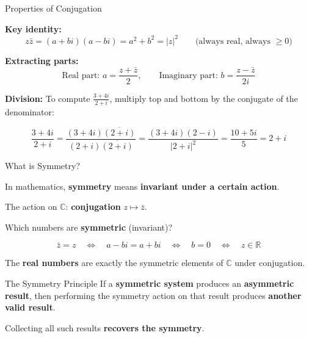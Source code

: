 \documentclass[10pt]{beamer}
\theoremstyle{definition}
\newcommand{\x}[1]{\alert{\textbf{#1}}}
\begin{document}
\begin{frame}{Properties of Conjugation}

\x{Key identity:}
$$z\bar{z} = (a+bi)(a-bi) = a^2 + b^2 = |z|^2 \qquad \text{(always real, always $\geq 0$)}$$

\vfill\pause

\x{Extracting parts:}
$$\text{Real part: } a = \frac{z + \bar{z}}{2}, \qquad \text{Imaginary part: } b = \frac{z - \bar{z}}{2i}$$

\vfill\pause

\x{Division:} To compute $\frac{3+4i}{2+i}$, multiply top and bottom by the conjugate of the denominator:

$$\frac{3+4i}{2+i} = \frac{(3+4i)\overline{(2+i)}}{(2+i)\overline{(2+i)}} = \frac{(3+4i)(2-i)}{|2+i|^2} = \frac{10 + 5i}{5} = 2 + i$$

\end{frame}


\begin{frame}{What is Symmetry?}

In mathematics, \x{symmetry} means \x{invariant under a certain action}.

\vfill

The action on $\mathbb{C}$: \x{conjugation} $z \mapsto \bar{z}$.

\vfill\pause

Which numbers are \x{symmetric} (invariant)?

$$\bar{z} = z \quad\iff\quad a - bi = a + bi \quad\iff\quad b = 0 \quad\iff\quad z \in \mathbb{R}$$

\vfill

The \x{real numbers} are exactly the symmetric elements of $\mathbb{C}$ under conjugation.

\vfill\pause

\begin{block}{The Symmetry Principle}
If a \x{symmetric system} produces an \x{asymmetric result}, then performing the symmetry action on that result produces \x{another valid result}.

\vfill

Collecting all such results \x{recovers the symmetry}.
\end{block}

\end{frame}
\end{document}
